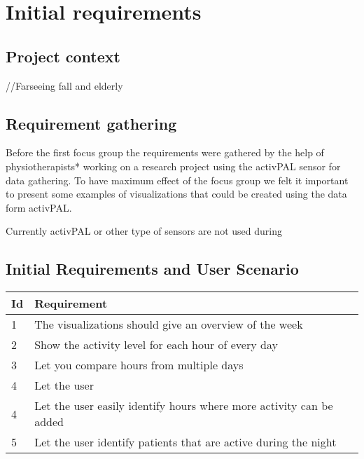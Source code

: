 \chapter{Initial requirements}

\section{Project context}
//Farseeing fall and elderly

\section{Requirement gathering}
Before the first focus group the requirements were gathered by the help of physiotherapists* working on a research project using the activPAL sensor for data gathering. To have maximum effect of the focus group we felt it important to present some examples of visualizations that could be created using the data form activPAL. 

Currently activPAL or other type of sensors are not used during 

\section{Initial Requirements and User Scenario}
\begin{table}[h!]
  \begin{center}
  \begin{tabular}{|l|p{12cm}|}
    \hline
      \textbf{Id} & \textbf{Requirement} \\ \hline
      1 & The visualizations should give an overview of the week \\ \hline
      2 & Show the activity level for each hour of every day \\ \hline
      3 & Let you compare hours from multiple days \\ \hline
      4 & Let the user  \\ \hline
      4 & Let the user easily identify hours where more activity can be added \\ \hline
      5 & Let the user identify patients that are active during the night \\ \hline
  \end{tabular}
  \end{center}
\end{table}
 
